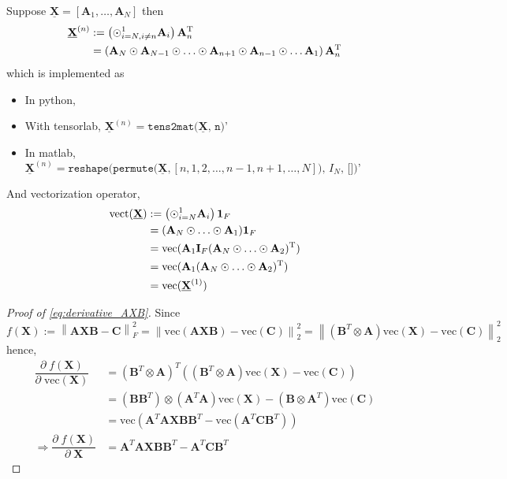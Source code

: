 \documentclass[11pt,a4paper]{article}
\newcommand{\norm}[1]{\left\lVert#1\right\rVert}
\theoremstyle{plain}
\theoremstyle{definition}
\theoremstyle{remark}
\begin{document}
Suppose $\underline{\mathbf{X}}=[\mathbf{A}_1, \ldots , \mathbf{A}_N]$ then 
\begin{align*}
    \underline{\mathbf{X}}^{(n)} &:= \left(  \odot_{i=N, i\neq n}^{1} \mathbf{A}_i\right) \mathbf{A}_n^{\rm T}  \\
    &= \left( \mathbf{A}_N \odot \mathbf{A}_{N-1} \odot \ldots \odot \mathbf{A}_{n+1} \odot \mathbf{A}_{n-1} \odot \ldots \mathbf{A}_{1} \right) \mathbf{A}_n^{\rm T} 
\end{align*}
which is implemented as 
\begin{itemize}
    \item In python, 
    \item With tensorlab, $\underline{\mathbf{X}}^{(n)} = \texttt{tens2mat($\underline{\mathbf{X}}$, n)'}$
    \item In matlab, $\underline{\mathbf{X}}^{(n)} = \texttt{reshape(permute($\underline{\mathbf{X}}, [n, 1, 2, \ldots, n-1, n+1, \ldots , N]$), $I_N$, [])'}$
\end{itemize}
And vectorization operator,
\begin{align*}
\text{vect}(\underline{\mathbf{X}}) 
&:= \left(  \odot_{i=N}^{1} \mathbf{A}_i\right) \mathbf{1}_F \\
&= (\mathbf{A}_N \odot \ldots \odot \mathbf{A}_1) \mathbf{1}_F \\
&= \text{vec}(\mathbf{A}_1 \mathbf{I}_F (\mathbf{A}_N  \odot \ldots \odot \mathbf{A}_2)^{\rm T}) \\
&= \text{vec}(\mathbf{A}_1 (\mathbf{A}_N  \odot \ldots \odot \mathbf{A}_2)^{\rm T}) \\
&= \text{vec}(\underline{\mathbf{X}}^{(1)}) \\
\end{align*} 

\begin{proof}[Proof of \ref{eq:derivative_AXB}]
    Since 
    \[
        f(\mathbf{X}) :=
    \norm{\mathbf{A}\mathbf{X}\mathbf{B} - \mathbf{C}}_F^2 
    = \norm{\text{vec}(\mathbf{A}\mathbf{X}\mathbf{B}) - \text{vec}(\mathbf{C})}_2^2
    = \norm{(\mathbf{B}^T \otimes \mathbf{A}) \text{vec}(\mathbf{X}) - \text{vec}(\mathbf{C})}_2^2
    \] 
    hence,
    \begin{align*}
        \dfrac{\partial\; f(\mathbf{X})}{\partial\; \text{vec}(\mathbf{X})}
        &= (\mathbf{B}^T  \otimes \mathbf{A})^T \left( (\mathbf{B}^T \otimes \mathbf{A}) \text{vec}(\mathbf{X}) - \text{vec}(\mathbf{C}) \right) \\
        &= (\mathbf{B} \mathbf{B}^T ) \otimes (\mathbf{A}^T \mathbf{A}) \text{vec}(\mathbf{X}) - (\mathbf{B} \otimes \mathbf{A}^T ) \text{vec}(\mathbf{C}) \\
        &= \text{vec}(\mathbf{A}^T \mathbf{A} \mathbf{X} \mathbf{B}\mathbf{B}^T - \text{vec}(\mathbf{A}^T \mathbf{C} \mathbf{B}^T )) \\
        \Rightarrow 
        \dfrac{\partial\; f(\mathbf{X})}{\partial\; \mathbf{X}} &= \mathbf{A}^T \mathbf{A}\mathbf{X}\mathbf{B}\mathbf{B}^T - \mathbf{A}^T \mathbf{C}\mathbf{B}^T 
    \end{align*}
\end{proof}
\end{document}
